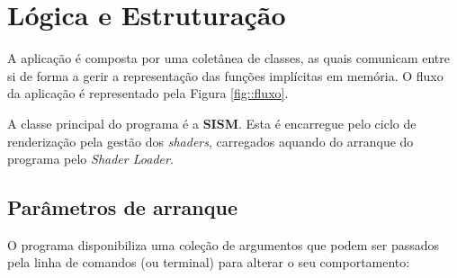 \section{Lógica e Estruturação}
\label{sec::impl:estrutura}

A aplicação é composta por uma coletânea de classes, as quais comunicam entre si de forma a gerir a representação das funções implícitas em memória. O fluxo da aplicação é representado pela Figura \ref{fig::fluxo}.

A classe principal do programa é a \textbf{\ac{SISM}}. Esta é encarregue pelo ciclo de renderização pela gestão dos \textit{shaders}, carregados aquando do arranque do programa pelo \textit{Shader Loader}.




\subsection{Parâmetros de arranque}
\label{ssec::impl:estrutura:start}

O programa disponibiliza uma coleção de argumentos que podem ser passados pela linha de comandos (ou terminal) para alterar o seu comportamento:

